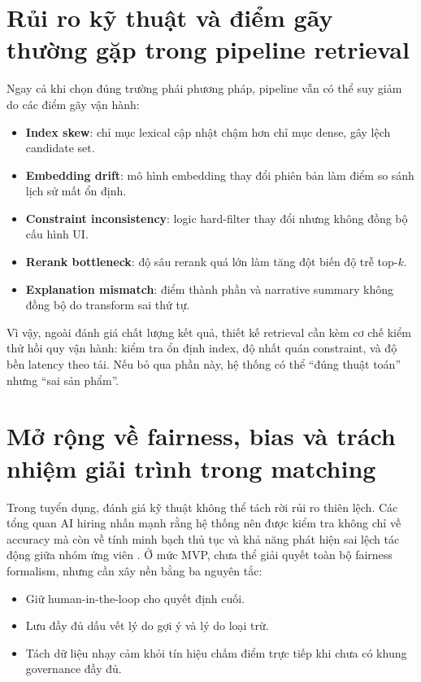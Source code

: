 \section{Rủi ro kỹ thuật và điểm gãy thường gặp trong pipeline retrieval}

Ngay cả khi chọn đúng trường phái phương pháp, pipeline vẫn có thể suy giảm do các điểm gãy vận hành:

\begin{itemize}
  \item \textbf{Index skew}: chỉ mục lexical cập nhật chậm hơn chỉ mục dense, gây lệch candidate set.
  \item \textbf{Embedding drift}: mô hình embedding thay đổi phiên bản làm điểm so sánh lịch sử mất ổn định.
  \item \textbf{Constraint inconsistency}: logic hard-filter thay đổi nhưng không đồng bộ cấu hình UI.
  \item \textbf{Rerank bottleneck}: độ sâu rerank quá lớn làm tăng đột biến độ trễ top-$k$.
  \item \textbf{Explanation mismatch}: điểm thành phần và narrative summary không đồng bộ do transform sai thứ tự.
\end{itemize}

Vì vậy, ngoài đánh giá chất lượng kết quả, thiết kế retrieval cần kèm cơ chế kiểm thử hồi quy vận hành: kiểm tra ổn định index, độ nhất quán constraint, và độ bền latency theo tải. Nếu bỏ qua phần này, hệ thống có thể “đúng thuật toán” nhưng “sai sản phẩm”.

\section{Mở rộng về fairness, bias và trách nhiệm giải trình trong matching}

Trong tuyển dụng, đánh giá kỹ thuật không thể tách rời rủi ro thiên lệch. Các tổng quan AI hiring nhấn mạnh rằng hệ thống nên được kiểm tra không chỉ về accuracy mà còn về tính minh bạch thủ tục và khả năng phát hiện sai lệch tác động giữa nhóm ứng viên \cite{ai-hiring-context,ethics-ai-recruiting}. Ở mức MVP, chưa thể giải quyết toàn bộ fairness formalism, nhưng cần xây nền bằng ba nguyên tắc:

\begin{itemize}
  \item Giữ human-in-the-loop cho quyết định cuối.
  \item Lưu đầy đủ dấu vết lý do gợi ý và lý do loại trừ.
  \item Tách dữ liệu nhạy cảm khỏi tín hiệu chấm điểm trực tiếp khi chưa có khung governance đầy đủ.
\end{itemize}

